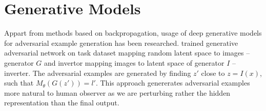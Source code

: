 \section{Generative Models}
\label{sec:advex_gan}
Appart from methods based on backpropagation, usage of deep generative models for adversarial example generation has been researched. \cite{gan-advex} trained generative adversarial network on task dataset mapping random latent space to images -- generator $G$ and invertor mapping images to latent space of generator $I$ -- inverter. The adversarial examples are generated by finding $z'$ close to $z = I(x)$, such that $M_\theta\left(G(z')\right) = l'$. This approach genererates adversarial examples more natural to human observer as we are perturbing rather the hidden representation than the final output.
